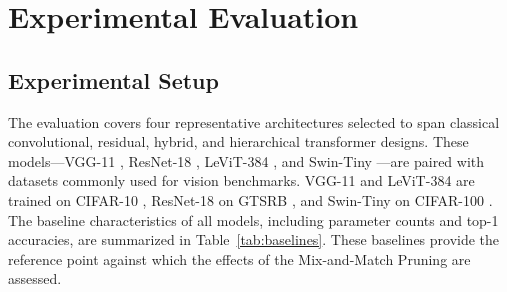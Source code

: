 \documentclass[11pt, conference]{IEEEtran}
\begin{document}


\FloatBarrier
\section{Experimental Evaluation}
\label{sec:results}
\subsection{Experimental Setup}

The evaluation covers four representative architectures selected to span classical convolutional, residual, hybrid, and hierarchical transformer designs. These models—VGG-11 \cite{simonyan2015vgg}, ResNet-18 \cite{he2016resnet}, LeViT-384 \cite{graham2021levit}, and Swin-Tiny \cite{liu2021swin}—are paired with datasets commonly used for vision benchmarks. VGG-11 and LeViT-384 are trained on CIFAR-10 \cite{krizhevsky2009cifar}, ResNet-18 on GTSRB \cite{stallkamp2012gtsrb}, and Swin-Tiny on CIFAR-100 \cite{krizhevsky2009cifar}. The baseline characteristics of all models, including parameter counts and top-1 accuracies, are summarized in Table~\ref{tab:baselines}. These baselines provide the reference point against which the effects of the Mix-and-Match Pruning are assessed.
\end{document}
